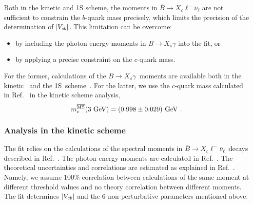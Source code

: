 Both in the kinetic and 1S scheme, the moments in $\bar B\to
X_c\ell^-\bar\nu_\ell$ are not sufficient to constrain the $b$-quark
mass precisely, which limits the precision of the determination of
$|V_{cb}|$. This limitation can be overcome:
\begin{itemize}
  \item by including the photon energy moments in $B\to X_s\gamma$
    into the fit, or
  \item by applying a precise constraint on the $c$-quark mass.
\end{itemize}
For the former, calculations of the $B\to X_s\gamma$~moments are
available both in the kinetic~\cite{Benson:2004sg} and the
1S~scheme~\cite{Bauer:2004ve}. For the latter, we use the $c$-quark
mass calculated in Ref.~\cite{Dehnadi:2011gc} in the kinetic scheme
analysis,
\begin{equation}
  m_c^{\overline{\rm MS}}(3~{\rm GeV})=(0.998\pm 0.029)~{\rm GeV}~.
\end{equation}

\subsubsection{Analysis in the kinetic scheme}
\label{globalfitsKinetic}

The fit relies on the calculations of the spectral moments in $\bar
B\to X_c\ell^-\bar\nu_\ell$~decays described in
Ref.~\cite{Gambino:2011cq}. The
photon energy moments are calculated in
Ref.~\cite{Benson:2004sg}. The theoretical uncertainties and
correlations are estimated as explained in
Ref.~\cite{Schwanda:2008kw}. Namely, we assume 100\% correlation
between calculations of the same moment at different threshold values
and no theory correlation between different moments. The fit
determines $|V_{cb}|$ and the 6 non-perturbative parameters mentioned
above.

